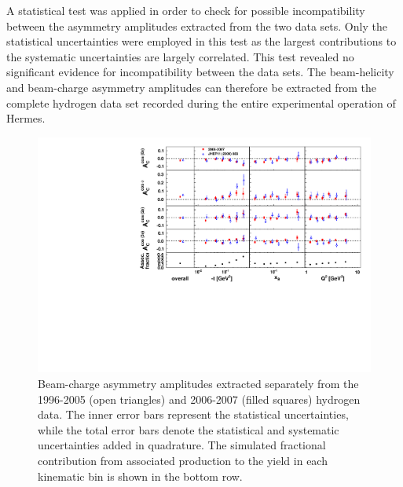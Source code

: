 A statistical test was applied in order to check for possible incompatibility between the asymmetry amplitudes extracted from the two data sets. Only the statistical uncertainties were employed in this test as the largest contributions to the systematic uncertainties are largely correlated. This test revealed no significant evidence for incompatibility between the data sets. The beam-helicity and beam-charge asymmetry amplitudes can therefore be extracted from the complete hydrogen data set recorded during the entire experimental operation of H{\sc ermes}.
\begin{figure}
\begin{center}
 \includegraphics[width=15cm,keepaspectratio]{bcaplots_eml_par13_bin6_pic_cluster_0607_9605_withassoc_dual}
  \caption{Beam-charge asymmetry amplitudes extracted separately from the 1996-2005 (open triangles) and 2006-2007 (filled squares) hydrogen data.
The inner error bars represent the statistical uncertainties, while the total error bars denote the statistical and systematic uncertainties added in quadrature. The simulated fractional contribution from associated production to the yield in each kinematic bin is shown in the bottom row.}
 \label{release_bca_0607}
\end{center}
 \end{figure}

